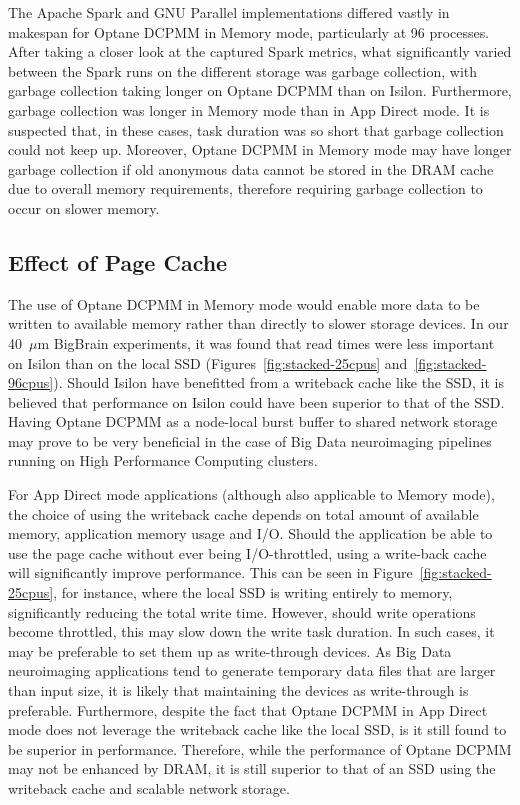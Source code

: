 \documentclass[conference]{IEEEtran}
\newcommand{\bigbrain}{BigBrain\xspace}
\begin{document}
The Apache Spark and GNU Parallel implementations differed vastly in makespan 
for Optane DCPMM in Memory mode, particularly at 96 processes. After taking a closer look at
the captured Spark metrics, what significantly varied between the Spark runs on
the different storage was garbage collection, with garbage collection taking longer on Optane DCPMM 
than on Isilon. Furthermore, garbage collection was longer in Memory mode than in
App Direct mode. It is suspected that, in these cases, task duration was so short
that garbage collection could not keep up. Moreover, Optane DCPMM in Memory mode may have longer
garbage collection if old anonymous data cannot be stored in the DRAM cache due to overall memory 
requirements, therefore requiring garbage collection to occur on slower memory.

\subsection{Effect of Page Cache}

The use of Optane DCPMM in Memory mode would enable more data to be written to available memory
rather than directly to slower storage devices. In our 40~$\mu$m \bigbrain experiments, it was found
that read times were less important on Isilon than on the local SSD (Figures~\ref{fig:stacked-25cpus}
and~\ref{fig:stacked-96cpus}). Should Isilon have benefitted from a 
writeback cache like the SSD, it is believed that performance on Isilon could have been superior 
to that of the SSD. Having Optane DCPMM as a node-local burst buffer to shared network storage 
may prove to be very beneficial in the case of Big Data neuroimaging pipelines running on
High Performance Computing clusters.

For App Direct mode applications (although also applicable to Memory mode), the 
choice of using the writeback cache depends on total amount of available memory, application
memory usage and I/O. Should the application be able to use the page cache without ever being
I/O-throttled, using a write-back cache will significantly improve performance. This can 
be seen in Figure~\ref{fig:stacked-25cpus}, for instance, where the local SSD is writing
entirely to memory, significantly reducing the total write time. However, should write operations
become throttled, this may slow down the write task duration. In such cases,
it may be preferable to set them up as write-through devices. As Big Data neuroimaging applications
tend to generate temporary data files that are larger than input size, it is likely that maintaining the
devices as write-through is preferable. Furthermore, despite the fact that Optane DCPMM in App Direct mode does
not leverage the writeback cache like the local SSD, is it still found to be superior in performance.
Therefore, while the performance of Optane DCPMM may not be enhanced by DRAM, it is still superior to that of
an SSD using the writeback cache and scalable network storage.
\end{document}
